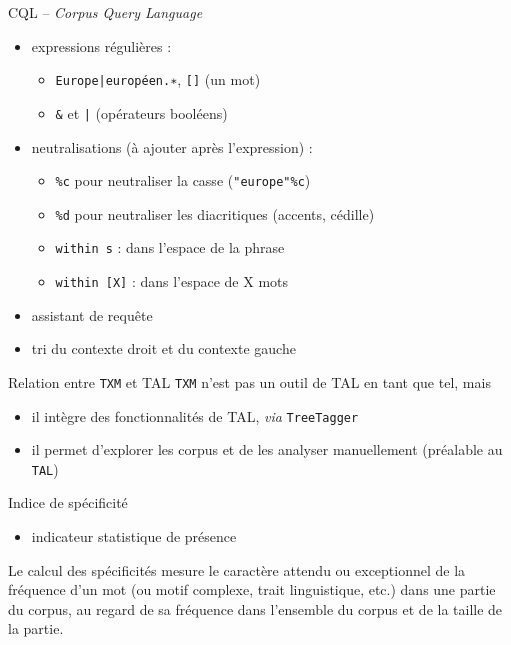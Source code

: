 \documentclass[xetex,xcolor={table,usenames,dvipsnames}]{beamer}
\begin{document}
\begin{frame}{\textsc{CQL} -- \textit{Corpus Query Language}}
	\begin{itemize}
		\item expressions régulières : 
		\begin{itemize}
		\item \texttt{Europe|européen.∗}, \texttt{[]} (un mot)
		\item \texttt{\&} et \texttt{|} (opérateurs booléens)
		\end{itemize}
		\item neutralisations (à ajouter après l’expression) :
		\begin{itemize}
			\item \texttt{\%c} pour neutraliser la casse (\texttt{"europe"\%c})
			\item \texttt{\%d} pour neutraliser les diacritiques (accents, cédille)
			\item \texttt{within s} : dans l’espace de la phrase
			\item \texttt{within [\textsc{X}]} : dans l'espace de \textsc{X} mots
		\end{itemize}
		\item assistant de requête
		\item tri du contexte droit et du contexte gauche
	\end{itemize}
\end{frame}

\begin{frame}{Relation entre \texttt{TXM} et \textsc{TAL}}
	\texttt{TXM} n’est pas un outil de \textsc{TAL} en tant que tel, mais 
	\begin{itemize}
		\item il intègre des fonctionnalités de \textsc{TAL}, \textit{via} \texttt{TreeTagger}
		\item il permet d’explorer les corpus et de les analyser manuellement (préalable au \texttt{TAL})
	\end{itemize}
\end{frame}



\begin{frame}{Indice de spécificité}
	\begin{itemize}
		\item indicateur statistique de présence
	\end{itemize}
	\begin{block}{\vspace{-6mm}}
		\justifying
		Le calcul des spécificités \citep{lafon1980variabilite} mesure le caractère attendu ou exceptionnel de la fréquence
	d'un mot (ou motif complexe, trait linguistique, etc.) dans une partie du corpus, au regard de sa fréquence dans l’ensemble du corpus et de la taille de la partie.
	\end{block}
	\begin{flushright}
		\small
		\citep{pincemin2022semantique}
	\end{flushright}
\end{frame}
\end{document}
